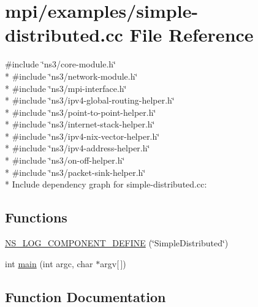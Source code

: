 \hypertarget{simple-distributed_8cc}{}\section{mpi/examples/simple-\/distributed.cc File Reference}
\label{simple-distributed_8cc}
{\ttfamily \#include \char`\"{}ns3/core-\/module.\+h\char`\"{}}\\*
{\ttfamily \#include \char`\"{}ns3/network-\/module.\+h\char`\"{}}\\*
{\ttfamily \#include \char`\"{}ns3/mpi-\/interface.\+h\char`\"{}}\\*
{\ttfamily \#include \char`\"{}ns3/ipv4-\/global-\/routing-\/helper.\+h\char`\"{}}\\*
{\ttfamily \#include \char`\"{}ns3/point-\/to-\/point-\/helper.\+h\char`\"{}}\\*
{\ttfamily \#include \char`\"{}ns3/internet-\/stack-\/helper.\+h\char`\"{}}\\*
{\ttfamily \#include \char`\"{}ns3/ipv4-\/nix-\/vector-\/helper.\+h\char`\"{}}\\*
{\ttfamily \#include \char`\"{}ns3/ipv4-\/address-\/helper.\+h\char`\"{}}\\*
{\ttfamily \#include \char`\"{}ns3/on-\/off-\/helper.\+h\char`\"{}}\\*
{\ttfamily \#include \char`\"{}ns3/packet-\/sink-\/helper.\+h\char`\"{}}\\*
Include dependency graph for simple-\/distributed.cc\+:
\subsection*{Functions}
\begin{DoxyCompactItemize}
\item 
\hyperlink{simple-distributed_8cc_a1b2a18e518450712e15682beb2ad64fa}{N\+S\+\_\+\+L\+O\+G\+\_\+\+C\+O\+M\+P\+O\+N\+E\+N\+T\+\_\+\+D\+E\+F\+I\+NE} (\char`\"{}Simple\+Distributed\char`\"{})
\item 
int \hyperlink{simple-distributed_8cc_a0ddf1224851353fc92bfbff6f499fa97}{main} (int argc, char $\ast$argv\mbox{[}$\,$\mbox{]})
\end{DoxyCompactItemize}


\subsection{Function Documentation}
